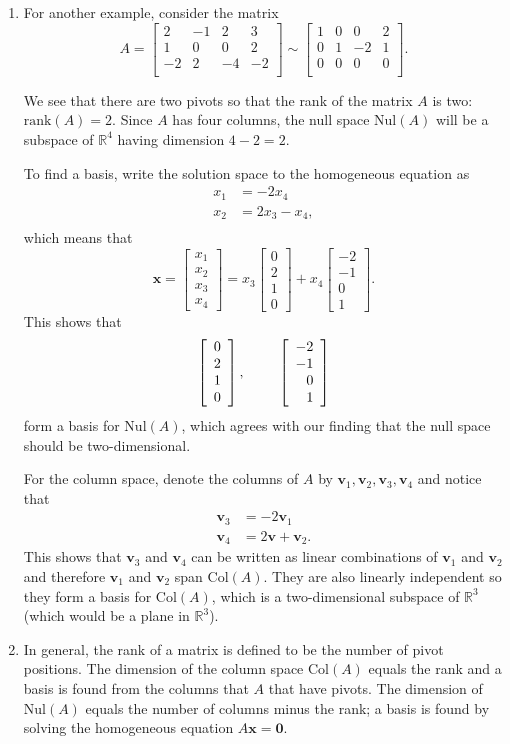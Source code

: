 \documentclass[12pt]{article}
\newcommand{\vvec}{{\mathbf v}}
\newcommand{\xvec}{{\mathbf x}}
\newcommand{\zerovec}{{\mathbf 0}}
\newcommand{\real}{{\mathbb R}}
\newcommand{\fourvec}[4]{\left[\begin{array}{r}#1 \\ #2 \\ #3 \\ #4
    \end{array}\right]}
\newcommand{\rank}{\text{rank}}
\newcommand{\col}{\text{Col}}
\newcommand{\nul}{\text{Nul}}
\begin{document}
\begin{enumerate}
\item For another example, consider the matrix
  $$A =
  \left[
    \begin{array}{cccc}
      2 & -1 & 2 & 3 \\
      1 & 0 & 0 & 2 \\
      -2 & 2 & -4 & -2 \\
    \end{array}
  \right]
  \sim
  \left[
    \begin{array}{ccccc}
      1 & 0 & 0 & 2 \\
      0 & 1 & -2 & 1 \\
      0 & 0 & 0 & 0 \\
    \end{array}
  \right].
  $$

  We see that there are two pivots so that the rank of the matrix $A$
  is two:  $\rank(A) = 2$.  Since $A$ has four columns, the null space
  $\nul(A)$ will be a subspace of $\real^4$ having dimension $4-2=2$.

  To find a basis, write the solution space to the homogeneous
  equation as
  $$
  \begin{aligned}
    x_1 & = -2x_4 \\
    x_2 & = 2x_3 - x_4, \\
  \end{aligned}
  $$
  which means that
  $$
  \xvec = \fourvec{x_1}{x_2}{x_3}{x_4}
  = x_3\fourvec0210 + x_4\fourvec{-2}{-1}01.
  $$
  This shows that
  $$
  \fourvec0210, \hspace*{24pt} \fourvec{-2}{-1}01
  $$
  form a basis for $\nul(A)$, which agrees with our finding that the
  null space should be two-dimensional.

  For the column space, denote the columns of $A$ by
  $\vvec_1,\vvec_2,\vvec_3,\vvec_4$ and notice that
  $$
  \begin{aligned}
    \vvec_3 & = -2\vvec_1 \\
    \vvec_4 & = 2\vvec + \vvec_2.
  \end{aligned}
  $$
  This shows that $\vvec_3$ and $\vvec_4$ can be written as linear
  combinations of $\vvec_1$ and $\vvec_2$ and therefore
  $\vvec_1$ and $\vvec_2$ span $\col(A)$.  They are also linearly
  independent so they form a basis for $\col(A)$, which is a
  two-dimensional subspace of $\real^3$ (which would be a plane in
  $\real^3$).

\item In general, the rank of a matrix is defined to be the number of
  pivot positions.  The dimension of the column space $\col(A)$
  equals the rank and a basis is found from the columns that $A$ that
  have pivots.  The dimension of $\nul(A)$ equals the number of
  columns minus the rank;  a basis is found by solving the homogeneous
  equation $A\xvec=\zerovec$.

  
  
\end{enumerate}
\end{document}
